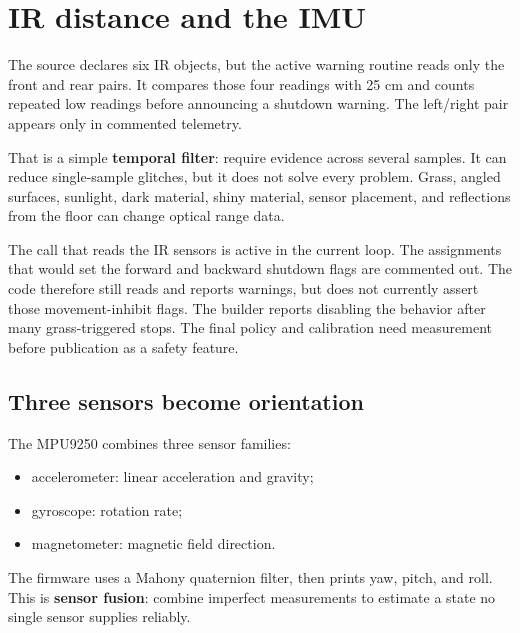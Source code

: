 \documentclass[11pt,openany]{book}
\begin{document}

\chapter{IR distance and the IMU}

The source declares six IR objects, but the active warning routine reads only the front and rear pairs. It compares those four readings with 25 cm and counts repeated low readings before announcing a shutdown warning. The left/right pair appears only in commented telemetry.

That is a simple \textbf{temporal filter}: require evidence across several samples. It can reduce single-sample glitches, but it does not solve every problem. Grass, angled surfaces, sunlight, dark material, shiny material, sensor placement, and reflections from the floor can change optical range data.

\begin{fieldnotebox}
The call that reads the IR sensors is active in the current loop. The assignments that would set the forward and backward shutdown flags are commented out. The code therefore still reads and reports warnings, but does not currently assert those movement-inhibit flags. The builder reports disabling the behavior after many grass-triggered stops. The final policy and calibration need measurement before publication as a safety feature.
\end{fieldnotebox}

\section*{Three sensors become orientation}

The MPU9250 combines three sensor families:

\begin{itemize}
  \item accelerometer: linear acceleration and gravity;
  \item gyroscope: rotation rate;
  \item magnetometer: magnetic field direction.
\end{itemize}

The firmware uses a Mahony quaternion filter, then prints yaw, pitch, and roll. This is \textbf{sensor fusion}: combine imperfect measurements to estimate a state no single sensor supplies reliably.
\end{document}
